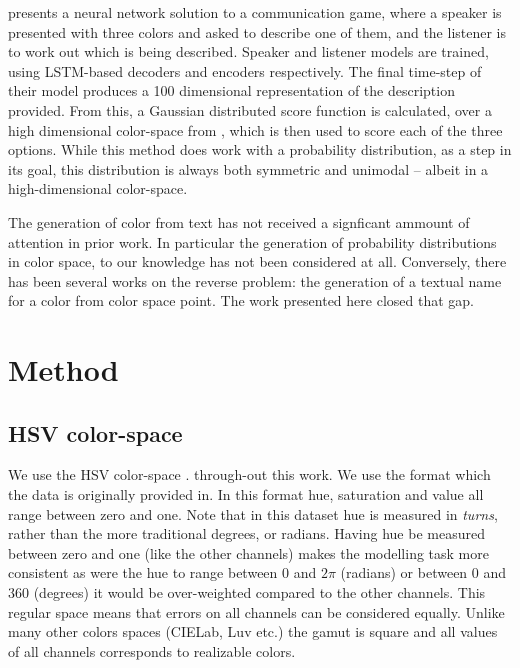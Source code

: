 \documentclass[11pt,a4paper]{article}
\newcommand{\parencite}{\citep}
\newcommand{\textcite}{\citet}
\begin{document}
\textcite{DBLP:journals/corr/MonroeHGP17} presents a neural network solution to a communication game, where a speaker is presented with three colors and asked to describe one of them, and the listener is to work out which is being described.
Speaker and listener models are trained, using LSTM-based decoders and encoders respectively.
The final time-step of their model produces a 100 dimensional representation of the description provided.
From this, a Gaussian distributed score function is calculated, over a high dimensional color-space from \textcite{2016arXiv160603821M}, which is then used to score each of the three options.
While this method does work with a probability distribution, as a step in its goal,
this distribution is always both symmetric and unimodal -- albeit in a high-dimensional color-space.

The generation of color from text has not received a signficant ammount of attention in prior work.
In particular the generation of probability distributions in color space, to our knowledge has not been considered at all.
Conversely, there has been several works on the reverse problem: the generation of a textual name for a color from color space point.
The work presented here closed that gap.




\section{Method}



\subsection{HSV color-space}
We use the HSV color-space \parencite{smith1978color}.
through-out this work.
We use the format which the data is originally provided in.
In this format hue, saturation and value all range between zero and one.
Note that in this dataset hue is measured in \emph{turns}, rather than the more traditional degrees, or radians.
Having hue be measured between zero and one (like the other channels) makes the modelling task more consistent as were the hue to range between $0$ and $2\pi$ (radians) or between $0$ and $360$ (degrees) it would be over-weighted compared to the other channels.
This regular space means that errors on all channels can be considered equally.
Unlike many other colors spaces (CIELab, Luv etc.) the gamut is square and all values of all channels corresponds to realizable colors.
\end{document}

